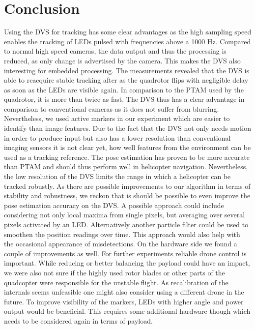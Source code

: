 \chapter{Conclusion}\label{sec:conclusion}

Using the DVS for tracking has some clear advantages as the high sampling speed enables the tracking of LEDs pulsed with frequencies above a 1000 Hz. Compared to normal high speed cameras, the data output and thus the processing is reduced, as only change is advertised by the camera. This makes the DVS also interesting for embedded processing.
The measurements revealed that the DVS is able to reacquire stable tracking after as the quadrotor flips with negligible delay as soon as the LEDs are visible again. In comparison to the PTAM used by the quadrotor, it is more than twice as fast. The DVS thus has a clear advantage in comparison to conventional cameras as it does not suffer from blurring. Nevertheless, we used active markers in our experiment which are easier to identify than image features. Due to the fact that the DVS not only needs motion in order to produce input but also has a lower resolution than conventional imaging sensors it is not clear yet, how well features from the environment can be used as a tracking reference. The pose estimation has proven to be more accurate than PTAM and should thus perform well in helicopter navigation. Nevertheless, the low resolution of the DVS limits the range in which a helicopter can be tracked robustly.
As there are possible improvements to our algorithm in terms of stability and robustness, we reckon that is should be possible to even improve the pose estimation accuracy on the DVS. A possible approach could include considering not only local maxima from single pixels, but averaging over several pixels activated by an LED. Alternatively another particle filter could be used to smoothen the position readings over time. This approach would also help with the occasional appearance of misdetections.
On the hardware side we found a couple of improvements as well. For further experiments reliable drone control is important. While reducing or better balancing the payload could have an impact, we were also not sure if the highly used rotor blades or other parts of the quadcopter were responsible for the unstable flight. As recalibration of the internals seems unfeasible one might also consider using a different drone in the future. To improve visibility of the markers, LEDs with higher angle and power output would be beneficial. This requires some additional hardware though which needs to be considered again in terms of payload. \\


